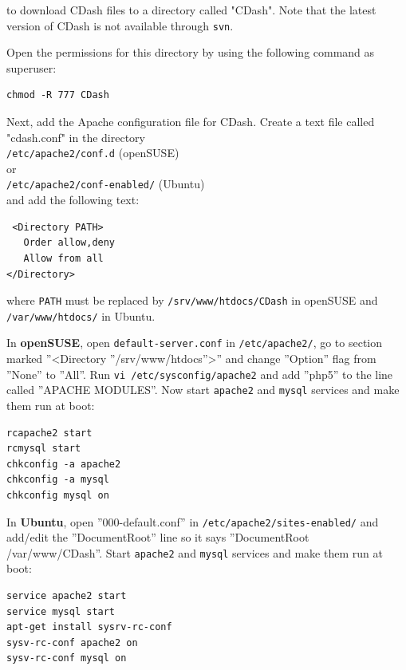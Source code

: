 \noindent to download CDash files to a directory called "CDash". Note that the latest version of CDash is not available through \verb!svn!.

Open the permissions for this directory by using the following command as superuser:

\small \begin{lstlisting}
chmod -R 777 CDash 
\end{lstlisting}\normalsize

Next, add the Apache configuration file for CDash. Create a text file called "cdash.conf" in the directory\\

\noindent \verb!/etc/apache2/conf.d! (openSUSE)\\

\noindent or\\

\noindent \verb!/etc/apache2/conf-enabled/! (Ubuntu)\\

\noindent and add the following text:

\small \begin{lstlisting}
 <Directory PATH>
   Order allow,deny
   Allow from all
</Directory>
\end{lstlisting}\normalsize

\noindent where \verb!PATH! must be replaced by \verb!/srv/www/htdocs/CDash! in openSUSE and \verb!/var/www/htdocs/! in Ubuntu.

In \textbf{openSUSE}, open \verb!default-server.conf! in \verb!/etc/apache2/!, go to section marked ''<Directory ''/srv/www/htdocs''>'' and change ''Option'' flag from ''None'' to ''All''. Run \verb!vi /etc/sysconfig/apache2! and add ''php5'' to the line called ''APACHE MODULES''. Now start \verb!apache2! and \verb!mysql! services and make them run at boot:

\small \begin{lstlisting}
rcapache2 start
rcmysql start
chkconfig -a apache2
chkconfig -a mysql
chkconfig mysql on
\end{lstlisting}\normalsize

In \textbf{Ubuntu}, open ''000-default.conf'' in \verb!/etc/apache2/sites-enabled/! and add/edit the ''DocumentRoot'' line so it says ''DocumentRoot /var/www/CDash''. Start \verb!apache2! and \verb!mysql! services and make them run at boot:

\small \begin{lstlisting}
service apache2 start
service mysql start
apt-get install sysrv-rc-conf
sysv-rc-conf apache2 on
sysv-rc-conf mysql on
\end{lstlisting}\normalsize

